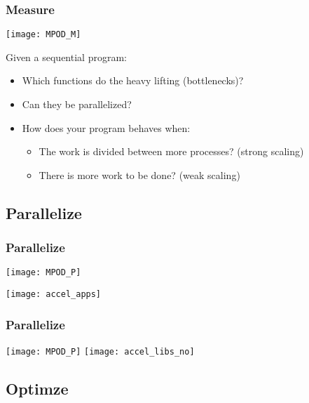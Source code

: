 \documentclass[10pt, compress]{beamer}
\begin{document}
\begin{frame}
    \frametitle{Measure}
    \begin{center}
    \texttt{[image: MPOD\_M]}
    \end{center}
    \vfill


    Given a \alert{sequential program}:
    \begin{itemize}
        \item Which functions do the \alert{heavy lifting} (\alert{bottlenecks})?

        \item Can they be \alert{parallelized}?

        \item How does your program behaves when:
            \begin{itemize}
                \item The work is divided between more processes? (\alert{strong scaling})

                \item There is more work to be done? (\alert{weak scaling})
            \end{itemize}
    \end{itemize}
\end{frame}

\subsection{Parallelize}

\begin{frame}
    \frametitle{Parallelize}
    \begin{center}
    \texttt{[image: MPOD\_P]}
    \vfill

    \texttt{[image: accel\_apps]}
    \end{center}
\end{frame}

\begin{frame}
    \frametitle{Parallelize}
    \begin{center}
    \texttt{[image: MPOD\_P]}
    \vfill
    \texttt{[image: accel\_libs\_no]}
    \end{center}
\end{frame}

\subsection{Optimze}
\end{document}
